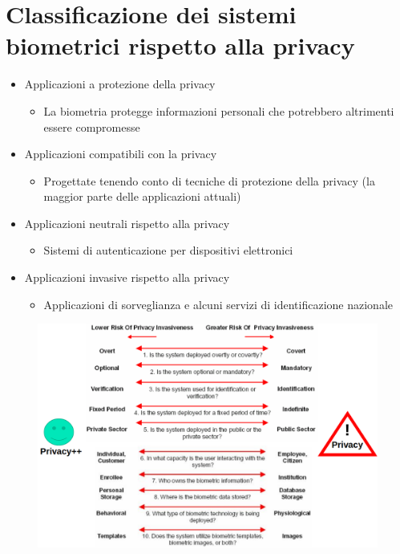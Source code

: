 \documentclass{report}
\begin{document}
\section{Classificazione dei sistemi biometrici rispetto alla privacy}
\begin{itemize}
    \item Applicazioni a protezione della privacy 
    \begin{itemize}
        \item La biometria protegge informazioni personali che potrebbero altrimenti essere compromesse
    \end{itemize}
    \item Applicazioni compatibili con la privacy 
    \begin{itemize}
        \item Progettate tenendo conto di tecniche di protezione della privacy (la maggior parte delle applicazioni attuali)
    \end{itemize}
    \item Applicazioni neutrali rispetto alla privacy 
    \begin{itemize}
        \item Sistemi di autenticazione per dispositivi elettronici 
    \end{itemize}
    \item Applicazioni invasive rispetto alla privacy 
    \begin{itemize}
        \item Applicazioni di sorveglianza e alcuni servizi di identificazione nazionale
    \end{itemize}
\end{itemize}

\begin{figure}[H]
    \centering
    \includegraphics[width=1\linewidth]{images/privacy.png}
\end{figure}
\end{document}
